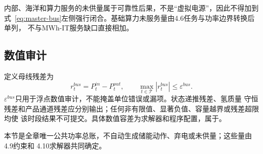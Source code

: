 内部、海洋和算力服务的未供量属于可靠性后果，不是“虚拟电源”，因此不得加到
式~\eqref{eq:master-bus}左侧强行闭合。基础算力未服务量由4.6任务与功率边界转换后单列，
不与MWh-IT服务缺口直接相加。

\subsection{数值审计}

定义母线残差为
\begin{equation}
r_t^{bus}=P_t^{in}-P_t^{out},\qquad
\max_{t\in\mathcal T}|r_t^{bus}|\le\varepsilon^{bus}.
\label{eq:bus-residual}
\end{equation}
$\varepsilon^{bus}$只用于浮点数值审计，不能掩盖单位错误或漏项。状态递推残差、氢质量
守恒残差和产品通道残差应分别输出；任何非有限值、显著负值、容量越界或残差超限均使
该时段结果不可提交。具体数值容差为求解器和程序配置，属于\assumptiontag。

本节是全章唯一公共功率总账，不自动生成储能动作、弃电或未供量；这些量由4.9约束和
4.10求解器共同确定。

